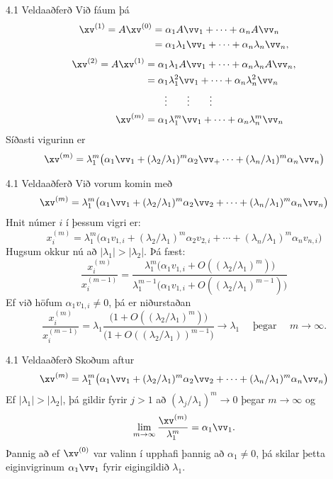 \begin{frame}{4.1 Veldaaðferð} 
Við fáum þá 
\begin{align*}
\xv^{(1)} =A\xv^{(0)}&=\alpha_1A\vv_1+\cdots+\alpha_nA\vv_n\\
&=\alpha_1\lambda_1\vv_1+\cdots+\alpha_n\lambda_n\vv_n,
\end{align*}
\pause
\begin{align*}
\xv^{(2)}=A\xv^{(1)}&=\alpha_1\lambda_1A\vv_1+\cdots+\alpha_n\lambda_nA\vv_n,\\
&=\alpha_1\lambda_1^2\vv_1+\cdots+\alpha_n\lambda_n^2\vv_n\\ 
& \qquad  \vdots\qquad  \vdots \qquad \vdots\\
\xv^{(m)}&=\alpha_1\lambda_1^m\vv_1+\cdots+\alpha_n\lambda_n^m\vv_n
\end{align*}
\pause
Síðasti vigurinn er 
$$
\xv^{(m)}=  \lambda_1^m 
\big(\alpha_1\vv_1+(\lambda_2/\lambda_1)^m\alpha_2\vv_+\cdots+
(\lambda_n/\lambda_1)^m \alpha_n\vv_n\big)
$$
\end{frame}


\begin{frame}{4.1 Veldaaðferð} 
Við vorum komin með 
$$
\xv^{(m)}=  \lambda_1^m 
\big(\alpha_1\vv_1+(\lambda_2/\lambda_1)^m\alpha_2\vv_2+\cdots+
(\lambda_n/\lambda_1)^m \alpha_n\vv_n\big)
$$
\pause
Hnit númer $i$ í þessum vigri er: 
$$
x_i^{(m)}=  \lambda_1^m 
\big(\alpha_1v_{1,i}+(\lambda_2/\lambda_1)^m\alpha_2v_{2,i}+\cdots+
(\lambda_n/\lambda_1)^m \alpha_nv_{n,i}\big)
$$
\pause
Hugsum okkur nú að $|\lambda_1|>|\lambda_2|$. Þá fæst:
$$
\dfrac{x_i^{(m)}}{x_i^{(m-1)}}
=
\dfrac{\lambda_1^m\big(\alpha_1v_{1,i}+O((\lambda_2/\lambda_1)^m)\big)}
{\lambda_1^{m-1}\big(\alpha_1v_{1,i}+O((\lambda_2/\lambda_1)^{m-1})\big)}
$$
\pause
Ef við höfum $\alpha_1v_{1,i}\neq 0$, þá er niðurstaðan
$$
\dfrac{x_i^{(m)}}{x_i^{(m-1)}}
=\lambda_1
\dfrac{\big(1+O((\lambda_2/\lambda_1)^m)\big)}
{\big(1+O((\lambda_2/\lambda_1))^{m-1}\big)} \to \lambda_1
\quad \text{ þegar }  \quad m\to \infty.
$$\end{frame}

\begin{frame}{4.1 Veldaaðferð} 
Skoðum aftur
$$
\xv^{(m)}=  \lambda_1^m 
\big(\alpha_1\vv_1+(\lambda_2/\lambda_1)^m\alpha_2\vv_2+\cdots+
(\lambda_n/\lambda_1)^m \alpha_n\vv_n\big)
$$
\pause
Ef $|\lambda_1|>|\lambda_2|$, þá gildir fyrir $j > 1$ að  
$(\lambda_j/\lambda_1)^m \to 0$ þegar $m \to \infty$ og \pause
$$
\lim_{m\to \infty} \frac{\xv^{(m)}}{\lambda_1^m} = \alpha_1 \vv_1.
$$
Þannig að ef $\xv^{(0)}$ var valinn í upphafi þannig að $\alpha_1 \neq 0$,
þá skilar þetta eiginvigrinum $\alpha_1\vv_1$ fyrir eigingildið $\lambda_1$.

\end{frame}



